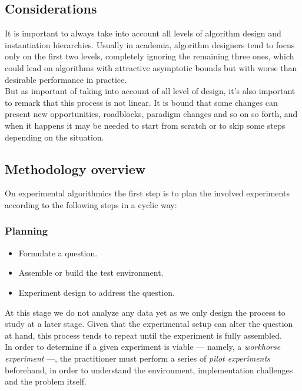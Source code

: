 \subsection{Considerations}
\label{SUBSECTION:EXPERIMENTAL_ALGORITMICS_CONSIDERATIONS}

It is important to always take into account all levels of algorithm design and instantiation hierarchies. Usually in academia, algorithm designers tend to focus only on the first two levels, completely ignoring the remaining three ones, which could lead on algorithms with attractive asymptotic bounds but with worse than desirable performance in practice.\\

But as important of taking into account of all level of design, it's also important to remark that this process is not linear. It is bound that some changes can present new opportunities, roadblocks, paradigm changes and so on so forth, and when it happens it may be needed to start from scratch or to skip some steps depending on the situation.\\


\subsection{Methodology overview}

On experimental algorithmics the first step is to plan the involved experiments according to the following steps in a cyclic way:\\

\subsubsection{Planning}
\begin{itemize}
    \item Formulate a question.
    \item Assemble or build the test environment.
    \item Experiment design to address the question.
\end{itemize}

At this stage we do not analyze any data yet as we only design the process to study at a later stage. Given that the experimental setup can alter the question at hand, this process tends to repeat until the experiment is fully assembled.\\

In order to determine if a given experiment is viable --- namely, a \emph{workhorse experiment} ---, the practitioner must perform a series of \emph{pilot experiments} beforehand, in order to understand the environment, implementation challenges and the problem itself. \\


